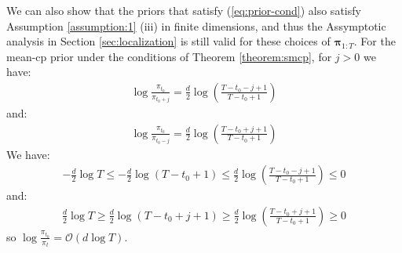 We can also show that the priors that satisfy (\ref{eq:prior-cond}) also satisfy Assumption \ref{assumption:1} (iii) in finite dimensions, and thus the Assymptotic analysis in Section \ref{sec:localization} is still valid for these choices of $\boldsymbol{\pi}_{1:T}$. For the mean-cp prior under the conditions of Theorem \ref{theorem:smcp}, for $j > 0$ we have:
\begin{align*}
    \log\frac{\pi_{t_0}}{\pi_{t_0+j}} = \frac{d}{2} \log\left(\frac{T-t_0 - j +1}{T - t_0 +1}\right)
\end{align*}
and:
\begin{align*}
    \log\frac{\pi_{t_0}}{\pi_{t_0-j}} = \frac{d}{2} \log\left(\frac{T-t_0 + j +1}{T - t_0 +1}\right)
\end{align*}
We have:
\begin{align*}
    -\frac{d}{2}\log T \leq -\frac{d}{2} \log\left(T - t_0 +1\right) \leq \frac{d}{2} \log\left(\frac{T-t_0 - j +1}{T - t_0 +1}\right) \leq 0
\end{align*}
and: 
\begin{align*}
    \frac{d}{2}\log T \geq \frac{d}{2} \log\left(T - t_0 + j +1\right) \geq \frac{d}{2} \log\left(\frac{T-t_0 + j +1}{T - t_0 +1}\right) \geq 0
\end{align*}
so $\log \frac{\pi_{t_0}}{\pi_t} = \mathcal{O}(d\log T)$.